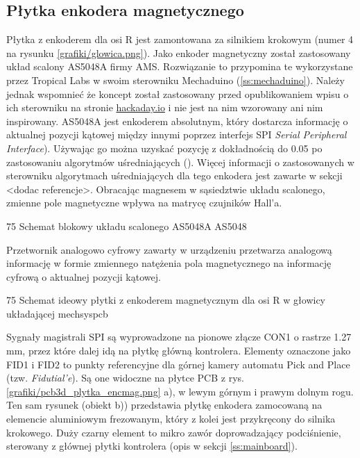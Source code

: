 \subsection{Płytka enkodera magnetycznego}
\label{ss:encmag}

Płytka z enkoderem dla osi R jest zamontowana za silnikiem krokowym (numer 4 na rysunku \ref{grafiki/glowica.png}). Jako enkoder magnetyczny został zastosowany układ scalony AS5048A firmy AMS. Rozwiązanie to przypomina te wykorzystane przez Tropical Labs w swoim sterowniku Mechaduino (\ref{ss:mechaduino}). Należy jednak wspomnieć że koncept został zastosowany przed opublikowaniem wpisu o ich sterowniku na stronie \url{hackaday.io} i nie jest na nim wzorowany ani nim inspirowany. AS5048A jest enkoderem absolutnym, który dostarcza informację o aktualnej pozycji kątowej między innymi poprzez interfejs SPI {\it Serial Peripheral Interface}). Używając go można uzyskać pozycję z dokładnością do 0.05\degree{} po zastosowaniu algorytmów uśredniających (\cite{AS5048}). Więcej informacji o zastosowanych w sterowniku algorytmach uśredniających dla tego enkodera jest zawarte w sekcji <dodac referencje>. Obracając magnesem w sąsiedztwie układu scalonego, zmienne pole magnetyczne wpływa na matrycę czujników Hall'a. 

	{75}
	{Schemat blokowy układu scalonego AS5048A}
	{AS5048}

Przetwornik analogowo cyfrowy zawarty w urządzeniu przetwarza analogową informację w formie zmiennego natężenia pola magnetycznego na informację cyfrową o aktualnej pozycji kątowej.

	{75}
	{Schemat ideowy płytki z enkoderem magnetycznym dla osi R w głowicy układającej}
	{mechsyspcb}
	
Sygnały magistrali SPI są wyprowadzone na pionowe złącze CON1 o rastrze 1.27 mm, przez które dalej idą na płytkę główną kontrolera. Elementy oznaczone jako FID1 i FID2 to punkty referencyjne dla górnej kamery automatu Pick and Place (tzw. {\it Fidutial'e}). Są one widoczne na płytce PCB z rys. \ref{grafiki/pcb3d_plytka_encmag.png} a), w lewym górnym i prawym dolnym rogu. Ten sam rysunek (obiekt b)) przedstawia płytkę enkodera zamocowaną na elemencie aluminiowym frezowanym, który z kolei jest przykręcony do silnika krokowego. Duży czarny element to mikro zawór doprowadzający podciśnienie, sterowany z głównej płytki kontrolera (opis w sekcji \ref{ss:mainboard}). \\

